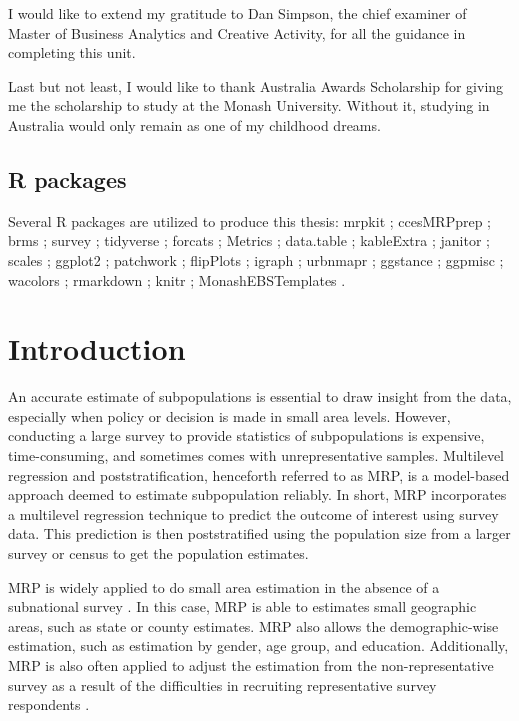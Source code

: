 \documentclass{monashthesis}
\begin{document}
I would like to extend my gratitude to Dan Simpson, the chief examiner of Master of Business Analytics and Creative Activity, for all the guidance in completing this unit.

Last but not least, I would like to thank Australia Awards Scholarship for giving me the scholarship to study at the Monash University. Without it, studying in Australia would only remain as one of my childhood dreams.

\hypertarget{r-packages}{%
\section*{R packages}\label{r-packages}}

Several R \autocite{R} packages are utilized to produce this thesis: mrpkit \autocite{mrpkit}; ccesMRPprep \autocite{ccesmrpprep}; brms \autocite{brms}; survey \autocite{survey}; tidyverse \autocite{tidyverse}; forcats \autocite{forcats}; Metrics \autocite{Metrics}; data.table \autocite{datatable}; kableExtra \autocite{kable}; janitor \autocite{janitor}; scales \autocite{scales}; ggplot2 \autocite{ggplot2}; patchwork \autocite{pw}; flipPlots \autocite{flipflops}; igraph \autocite{igraph}; urbnmapr \autocite{urban}; ggstance \autocite{stance}; ggpmisc \autocite{ggpmisc}; wacolors \autocite{wacolors}; rmarkdown \autocite{rmd}; knitr \autocite{knitr}; MonashEBSTemplates \autocite{monashtemp}.

\hypertarget{ch:intro}{%
\chapter{Introduction}\label{ch:intro}}

An accurate estimate of subpopulations is essential to draw insight from the data, especially when policy or decision is made in small area levels. However, conducting a large survey to provide statistics of subpopulations is expensive, time-consuming, and sometimes comes with unrepresentative samples. Multilevel regression and poststratification, henceforth referred to as MRP, is a model-based approach deemed to estimate subpopulation reliably. In short, MRP incorporates a multilevel regression technique to predict the outcome of interest using survey data. This prediction is then poststratified using the population size from a larger survey or census to get the population estimates.

MRP is widely applied to do small area estimation in the absence of a subnational survey \autocite{hanretty}. In this case, MRP is able to estimates small geographic areas, such as state or county estimates. MRP also allows the demographic-wise estimation, such as estimation by gender, age group, and education. Additionally, MRP is also often applied to adjust the estimation from the non-representative survey as a result of the difficulties in recruiting representative survey respondents \autocite{mrp-book}.
\end{document}
